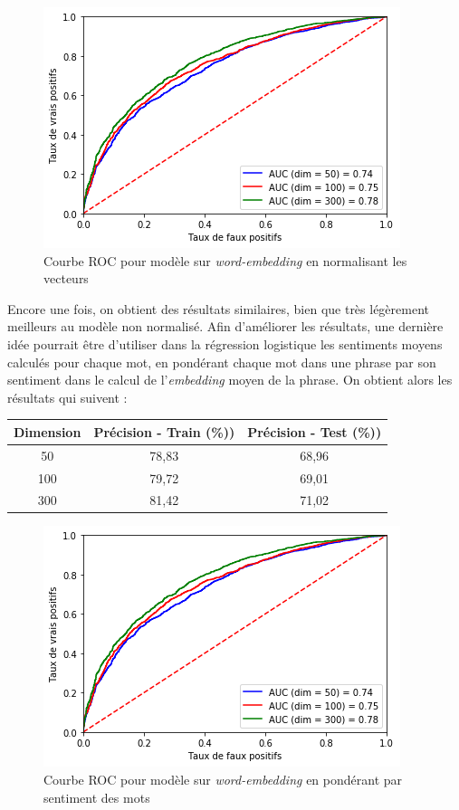 \documentclass[11pt,french,french]{article}
\begin{document}
\begin{figure}
\centering
\includegraphics{img/roc_word_norm.png}
\caption{Courbe ROC pour modèle sur \emph{word-embedding} en normalisant
les vecteurs}
\end{figure}

Encore une fois, on obtient des résultats similaires, bien que très
légèrement meilleurs au modèle non normalisé. \newline Afin d'améliorer
les résultats, une dernière idée pourrait être d'utiliser dans la
régression logistique les sentiments moyens calculés pour chaque mot, en
pondérant chaque mot dans une phrase par son sentiment dans le calcul de
l'\emph{embedding} moyen de la phrase. On obtient alors les résultats
qui suivent :

\begin{center}
\begin{tabular}{| c || c | c |}
\hline
Dimension & Précision - Train (\%)) & Précision - Test (\%)) \\ \hline
50 & 78,83 & 68,96 \\ \hline
100 & 79,72 & 69,01 \\ \hline
300 & 81,42 & 71,02 \\ \hline
\end{tabular}
\end{center}

\begin{figure}
\centering
\includegraphics{img/roc_word_norm.png}
\caption{Courbe ROC pour modèle sur \emph{word-embedding} en pondérant
par sentiment des mots}
\end{figure}
\end{document}

